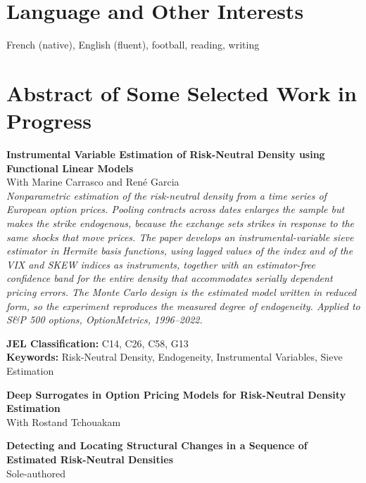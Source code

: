 \documentclass[11pt,letterpaper]{article}
\newenvironment{block}{\begin{list}{}{\setlength{\leftmargin}{1.6em}\setlength{\topsep}{0pt}%
  \setlength{\partopsep}{0pt}\setlength{\itemsep}{0pt}\setlength{\parsep}{0pt}}\item[]}{\end{list}}
\newcommand{\gap}{\par\vspace{0.6em}}
\begin{document}
\section*{Language and Other Interests}
\begin{block}
French (native), English (fluent), football, reading, writing
\end{block}

\section*{Abstract of Some Selected Work in Progress}
\begin{block}
\textbf{Instrumental Variable Estimation of Risk-Neutral Density using Functional Linear Models}\\
With Marine Carrasco and René Garcia\\
\textit{Nonparametric estimation of the risk-neutral density from a time series of European option prices.
Pooling contracts across dates enlarges the sample but makes the strike endogenous, because the exchange
sets strikes in response to the same shocks that move prices. The paper develops an instrumental-variable
sieve estimator in Hermite basis functions, using lagged values of the index and of the VIX and SKEW
indices as instruments, together with an estimator-free confidence band for the entire density that
accommodates serially dependent pricing errors. The Monte Carlo design is the estimated model written in
reduced form, so the experiment reproduces the measured degree of endogeneity. Applied to S\&P 500
options, OptionMetrics, 1996--2022.}

\vspace{0.4em}
\hspace*{4em}\textbf{JEL Classification:} C14, C26, C58, G13\\
\hspace*{4em}\textbf{Keywords:} Risk-Neutral Density, Endogeneity, Instrumental Variables, Sieve Estimation
\gap\gap
\textbf{Deep Surrogates in Option Pricing Models for Risk-Neutral Density Estimation}\\
With Rostand Tchouakam
\gap\gap
\textbf{Detecting and Locating Structural Changes in a Sequence of Estimated Risk-Neutral Densities}\\
Sole-authored
\end{block}
\end{document}
